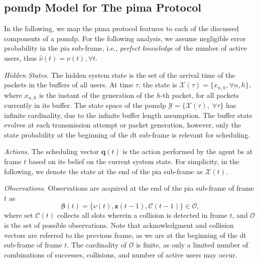\documentclass[conference]{IEEEtran}
\begin{document}
\subsection{\ac{pomdp} Model for The \ac{pima} Protocol}\label{sec4a}

In the following, we map the \ac{pima} protocol features to each of the discussed components of a \ac{pomdp}.
For the following analysis, we assume negligible error probability in the \ac{pia} sub-frame, i.e., \textit{perfect knowledge} of the number of active users, thus $\hat{\nu}(t) = \nu(t), \forall t$.

\vspace{5pt}\noindent\emph{Hidden States.} The hidden system state is the set of the arrival time of the packets in the buffers of all users. At time $\tau$, the state is $\bm{\mathcal{X}}(\tau) = \{x_{n, h}, \forall n, h\}$, where $x_{n,h}$ is the instant of the generation of the $h$-th packet, for all packets currently in its buffer. The state space of the \ac{pomdp} $\mathcal{Y} = \{\bm{\mathcal{X}}(\tau), \; \forall \tau\}$ has infinite cardinality, due to the infinite buffer length assumption. The buffer state evolves at each transmission attempt or packet generation, however, only the state probability at the beginning of the \ac{dt} sub-frame is relevant for scheduling.

\vspace{5pt}\noindent\emph{Actions.} The scheduling vector $\bm{q}(t)$ is the action performed by the agent \ac{bs} at frame $t$ based on its belief on the current system state. For simplicity, in the following, we denote the state at the end of the \ac{pia} sub-frame as $\bm{\mathcal{X}}(t)$. 

\vspace{5pt}\noindent\emph{Observations.}
Observations are acquired at the end of the \ac{pia} sub-frame of frame $t$ as
\begin{equation}\label{defos}
    \bm{\bm{\beta}}(t) = \{\nu(t), \bm{z}(t-1), \mathcal{C}(t-1)\} \in \mathcal{O},
\end{equation}
where set $\mathcal{C}(t)$ collects all slots wherein a collision is detected in frame $t$, and  $\mathcal{O}$ is the set of possible observations. Note that acknowledgment and collision vectors are referred to the previous frame, as we are at the beginning of the \ac{dt} sub-frame of frame $t$.  
The cardinality of $\mathcal{O}$ is finite, as only a limited number of combinations of successes, collisions, and number of active users may occur. 
\end{document}
